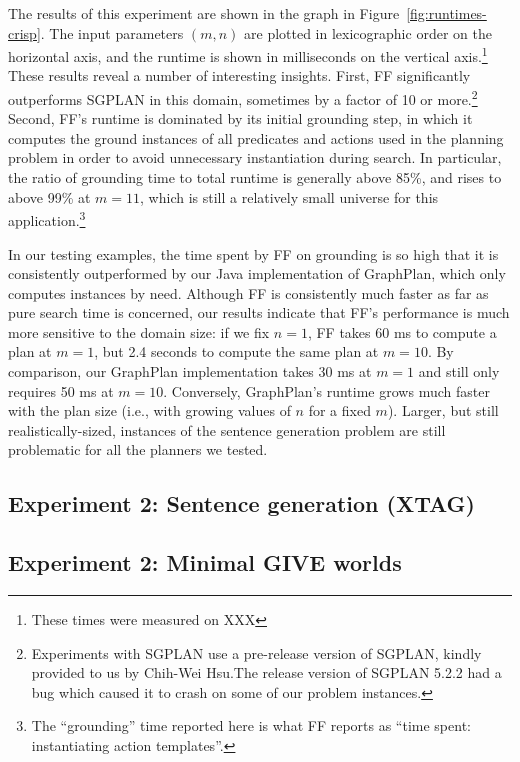 The results of this experiment are shown in the graph in
Figure~\ref{fig:runtimes-crisp}. The input parameters $(m,n)$ are
plotted in lexicographic order on the horizontal axis, and the runtime
is shown in milliseconds on the vertical axis.\footnote{These times
  were measured on XXX} These results reveal a number of interesting
insights. First, FF significantly outperforms SGPLAN in this domain,
sometimes by a factor of 10 or more.\footnote{Experiments with SGPLAN
  use a pre-release version of SGPLAN, kindly provided to us by
  Chih-Wei Hsu.The release version of SGPLAN 5.2.2 had a bug which
  caused it to crash on some of our problem instances.}  Second, FF's
runtime is dominated by its initial grounding step, in which it
computes the ground instances of all predicates and actions used in
the planning problem in order to avoid unnecessary instantiation
during search.  In particular, the ratio of grounding time to total
runtime is generally above 85\%, and rises to above 99\% at $m=11$,
which is still a relatively small universe for this
application.\footnote{The ``grounding'' time reported here is what FF
  reports as ``time spent: instantiating action templates''.}

In our testing examples, the time spent by FF on grounding is so high
that it is consistently outperformed by our Java implementation of
GraphPlan, which only computes instances by need. Although FF is
consistently much faster as far as pure search time is concerned, our
results indicate that FF's performance is much more sensitive to the
domain size: if we fix $n=1$, FF takes 60 ms to compute a plan at
$m=1$, but 2.4 seconds to compute the same plan at $m=10$. By
comparison, our GraphPlan implementation takes 30 ms at $m=1$ and
still only requires 50 ms at $m=10$. Conversely, GraphPlan's runtime
grows much faster with the plan size (i.e., with growing values of $n$
for a fixed $m$). Larger, but still realistically-sized, instances of
the sentence generation problem are still problematic for all the
planners we tested.

\subsection{Experiment 2: Sentence generation (XTAG)}
\label{sec:exper-2:-sent-xtag}




\subsection{Experiment 2: Minimal GIVE worlds}
\label{sec:exper-2:-minim}


